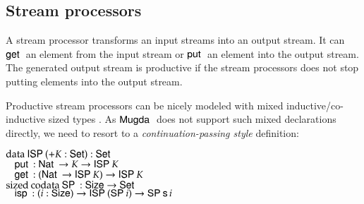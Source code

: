 \subsection{Stream processors}

A stream processor \cite{journals/entcs/GhaniHP06} transforms an input streams into an output stream.
It can $\mathsf{get}\:$ an element from the input stream or $\mathsf{put}\:$ an element into the output stream.
The generated output stream is productive if the stream processors does not stop putting elements into the output stream.

Productive stream processors can be nicely modeled with mixed inductive/co-inductive sized types \cite{abel:aplas07}. 
As $\textsf{Mugda }$ does not support such mixed declarations directly, we need to resort to a \emph{continuation-passing style} definition:
\begin{bsp}
$\mathrm{data}\: \mathsf{ISP}\: ( + K : \mathsf{Set}) : \mathsf{Set}$\\
$\hspace*{3mm} \mathsf{put}\: : \mathsf{Nat}\: \rightarrow K \rightarrow \mathsf{ISP}\: K$ \\
$\hspace*{3mm} \mathsf{get}\: : (\mathsf{Nat}\: \rightarrow \mathsf{ISP}\: K) \rightarrow \mathsf{ISP}\: K $ \\

$\mathrm{sized}\: \mathrm{codata}\: \mathsf{SP}\: : \mathsf{Size} \rightarrow \mathsf{Set}$\\
$\hspace*{3mm} \mathsf{isp}\: : (i : \mathsf{Size}) \rightarrow \mathsf{ISP}\: (\mathsf{SP}\: i) \rightarrow \mathsf{SP}\: \mathsf{s}\, i$
\end{bsp}

